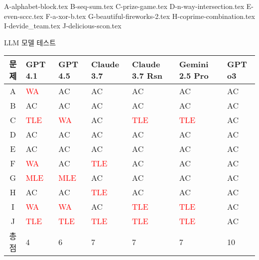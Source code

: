     {A-alphabet-block.tex}
    {B-seq-sum.tex}
    {C-prize-game.tex}
    {D-n-way-intersection.tex}
    {E-even-sccc.tex}
    {F-a-xor-b.tex}
    {G-beautiful-fireworks-2.tex}
    {H-coprime-combination.tex}
    {I-devide_team.tex}
    {J-delicious-scon.tex}

    \begin{frame}{LLM 모델 테스트}
        \begin{center}
            \begin{tabular}{c|l|l|l|l|l|l}
                문제 & GPT 4.1 & GPT 4.5 & Claude 3.7 & Claude 3.7 Rsn & Gemini 2.5 Pro & GPT o3 \\ \hline
                A & \textcolor{red}{WA}  & \textcolor{acgreen}{AC}  & \textcolor{acgreen}{AC}  & \textcolor{acgreen}{AC}  & \textcolor{acgreen}{AC}  & \textcolor{acgreen}{AC} \\ \hline
                B & \textcolor{acgreen}{AC}  & \textcolor{acgreen}{AC}  & \textcolor{acgreen}{AC}  & \textcolor{acgreen}{AC}  & \textcolor{acgreen}{AC}  & \textcolor{acgreen}{AC} \\ \hline
                C & \textcolor{red}{TLE} & \textcolor{red}{WA}  & \textcolor{acgreen}{AC}  & \textcolor{red}{TLE} & \textcolor{red}{TLE} & \textcolor{acgreen}{AC} \\ \hline
                D & \textcolor{acgreen}{AC}  & \textcolor{acgreen}{AC}  & \textcolor{acgreen}{AC}  & \textcolor{acgreen}{AC}  & \textcolor{acgreen}{AC}  & \textcolor{acgreen}{AC} \\ \hline
                E & \textcolor{acgreen}{AC}  & \textcolor{acgreen}{AC}  & \textcolor{acgreen}{AC}  & \textcolor{acgreen}{AC}  & \textcolor{acgreen}{AC}  & \textcolor{acgreen}{AC} \\ \hline
                F & \textcolor{red}{WA}  & \textcolor{acgreen}{AC}  & \textcolor{red}{TLE} & \textcolor{acgreen}{AC}  & \textcolor{acgreen}{AC}  & \textcolor{acgreen}{AC} \\ \hline
                G & \textcolor{red}{MLE} & \textcolor{red}{MLE} & \textcolor{acgreen}{AC}  & \textcolor{acgreen}{AC}  & \textcolor{acgreen}{AC}  & \textcolor{acgreen}{AC} \\ \hline
                H & \textcolor{acgreen}{AC}  & \textcolor{acgreen}{AC}  & \textcolor{red}{TLE} & \textcolor{acgreen}{AC}  & \textcolor{acgreen}{AC}  & \textcolor{acgreen}{AC} \\ \hline
                I & \textcolor{red}{WA}  & \textcolor{red}{WA}  & \textcolor{acgreen}{AC}  & \textcolor{red}{TLE} & \textcolor{red}{TLE} & \textcolor{acgreen}{AC} \\ \hline
                J & \textcolor{red}{TLE} & \textcolor{red}{TLE} & \textcolor{red}{TLE} & \textcolor{red}{TLE} & \textcolor{red}{TLE} & \textcolor{acgreen}{AC} \\ \hline
                총점 & 4 & 6 & 7 & 7 & 7 & 10
            \end{tabular}
        \end{center}
    \end{frame}
    
